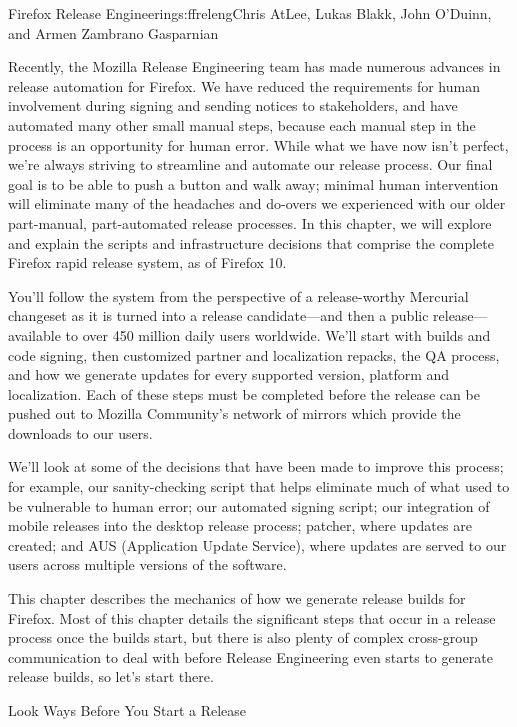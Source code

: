\begin{aosachapter}{Firefox Release Engineering}{s:ffreleng}{Chris AtLee, Lukas Blakk, John O'Duinn, and Armen Zambrano Gasparnian}

Recently, the Mozilla Release Engineering team has made numerous advances
in release automation for Firefox. We have
reduced the requirements for human involvement during signing and sending
notices to stakeholders, and have automated
many other small manual steps, because each manual step in the process is an
opportunity for human error. While what we have now isn't perfect,
we're always striving to streamline and automate our release
process. Our final goal is to be able to push a button and walk away;
minimal human intervention will eliminate many of the
headaches and do-overs we experienced with our older part-manual,
part-automated release processes. In this chapter, we will explore and
explain the scripts and infrastructure decisions that comprise
the complete Firefox rapid release system, as of Firefox 10.

You'll follow the system from the perspective of a release-worthy
Mercurial changeset as it is turned into a release candidate---and
then a public release---available to over 450 million daily users
worldwide.  We'll start with builds and code signing, then customized
partner and localization repacks, the QA process, and how we generate
updates for every supported version, platform and localization. Each of
these steps must be completed before the release can be pushed out to
Mozilla Community's network of mirrors which provide the downloads to
our users.

We'll look at some of the decisions that have been made to
improve this process; for example, our sanity-checking script that helps
eliminate much of what used to be vulnerable to human error; our
automated signing script; our integration of mobile releases into the
desktop release process; patcher, where updates are created; and AUS (Application Update Service), where updates are
served to our users across multiple versions of the software.

This chapter describes the mechanics of how we generate release builds
for Firefox. Most of this chapter details the significant
steps that occur in a release process once the builds start, but
there is also plenty of complex cross-group communication to deal
with before Release Engineering even starts to generate release
builds, so let's start there.

\begin{aosasect1}{Look  Ways Before You Start a Release}


\end{aosasect1}
\end{aosachapter}
